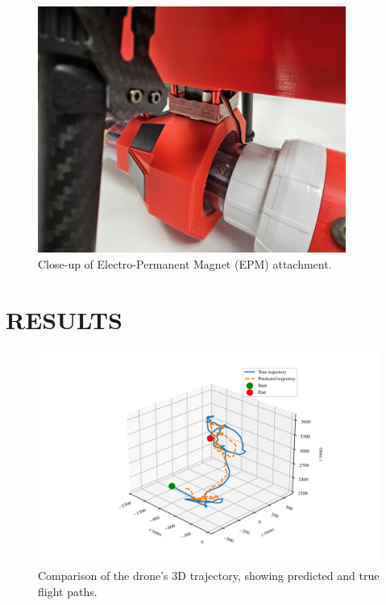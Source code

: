 \documentclass[]{spie}  %
\begin{document}
	\begin{figure}[h]
		\centering
		\includegraphics[width=0.9\textwidth]{figures/Figure2_EPM}
		\caption{Close-up of Electro-Permanent Magnet (EPM) attachment.}
		\label{fig:Figure2_EPM}
	\end{figure}
	
	\section{RESULTS}
	\label{sec:results}
	\lipsum[1-3]
	
	\begin{figure}[H]
		\centering
		\includegraphics[width=8.0in]{figures/Figure3_3D_Trajectory}
		\caption{Comparison of the drone's 3D trajectory, showing predicted and true flight paths.}
		\label{fig:Figure3_3D_Trajectory}
	\end{figure}
	
\end{document}
